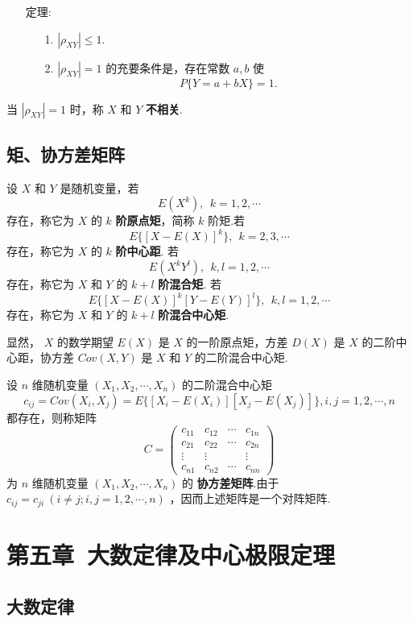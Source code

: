 \documentclass[UTF8,10pt]{ctexart}
\begin{document}
	\begin{itemize}
		\item [定理:] {
			\begin{enumerate}
				\item [1.] $ | \rho _{XY} | \le 1. $
				\item [2.] $ | \rho _{XY} | = 1 $ 的充要条件是，存在常数 $ a,b $ 使 $$ P\{Y=a+bX\}=1. $$
			\end{enumerate}
		}
	\end{itemize}

	当 $ | \rho _{XY} | = 1 $ 时，称 $ X $ 和 $ Y $ \textbf{不相关}.
	
	\subsection{矩、协方差矩阵}
	
	设 $ X $ 和 $ Y $ 是随机变量，若 $$ E(X^{k}),\ \ k=1,2, \cdots $$ 存在，称它为 $ X $ 的 $ k $ \textbf{阶原点矩}，简称 $ k $ 阶矩.若 $$ E\{[X-E(X)]^{k}\},\ \ k=2,3, \cdots $$ 存在，称它为 $ X $ 的 $ k $ \textbf{阶中心距}. 若 $$ E(X^{k}Y^{l}),\ \ k,l=1,2, \cdots $$ 存在，称它为 $ X $ 和 $ Y $ 的 $ k+l $ \textbf{阶混合矩}. 若 $$ E\{[X-E(X)]^{k}[Y-E(Y)]^{l}\},\ \ k,l=1,2, \cdots $$ 存在，称它为 $ X $ 和 $ Y $ 的 $ k+l $ \textbf{阶混合中心矩}.
	
	显然， $ X $ 的数学期望 $ E(X) $ 是 $ X $ 的一阶原点矩，方差 $ D(X) $ 是 $ X $ 的二阶中心距，协方差 $ Cov(X,Y) $ 是 $ X $ 和 $ Y $ 的二阶混合中心矩.
	
	设 $ n $ 维随机变量 $ (X_{1},X_{2}, \cdots ,X_{n}) $ 的二阶混合中心矩 $$ c_{ij}=Cov(X_{i},X_{j})=E\{[X_{i}-E(X_{i})][X_{j}-E(X_{j})]\},i,j=1,2, \cdots ,n $$ 都存在，则称矩阵 $$ C= \left( \begin{matrix} c_{11} & c_{12} & \cdots & c_{1n} \\ c_{21} & c_{22} & \cdots & c_{2n} \\ \vdots & \vdots & & \vdots \\ c_{n1} & c_{n2} & \cdots & c_{nn} \end{matrix} \right) $$ 为 $ n $ 维随机变量 $ (X_{1},X_{2}, \cdots ,X_{n}) $ 的 \textbf{协方差矩阵}.由于 $ c_{ij}=c_{ji}\ (i \ne j;i,j=1,2, \cdots ,n) $  ，因而上述矩阵是一个对阵矩阵.
	
	\section{第五章\ 大数定律及中心极限定理}
	
	\subsection{大数定律}
	
\end{document}
